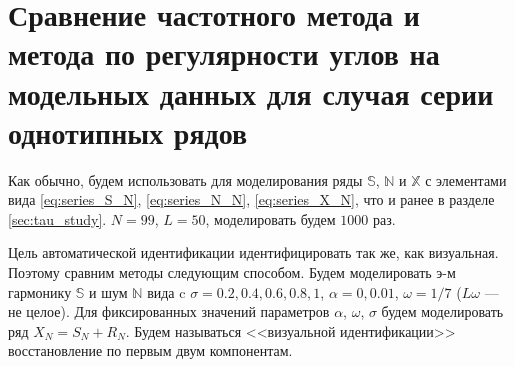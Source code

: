 \documentclass[specialist,
               substylefile = spbu.rtx,
               subf,href,colorlinks=true, 12pt]{disser}
\begin{document}
%
%
%
%

\section{Сравнение частотного метода и метода по регулярности углов на модельных данных для случая серии однотипных рядов}
\label{sec:comp_tau1_pgram_many_same_series}
Как обычно, будем использовать для моделирования ряды $\mathbb{S}$, $\mathbb{N}$ и $\mathbb{X}$ с элементами вида
\eqref{eq:series_S_N}, \eqref{eq:series_N_N}, \eqref{eq:series_X_N}, что и ранее в разделе \ref{sec:tau_study}.
$N = 99$, $L = 50$, моделировать будем $1000$ раз.

Цель автоматической идентификации идентифицировать так же, как визуальная.
Поэтому сравним методы следующим способом.
Будем моделировать э-м гармонику $\mathbb{S}$ и шум $\mathbb{N}$ вида
c $\sigma = 0.2, 0.4, 0.6, 0.8, 1$, $\alpha = 0, 0.01$, $\omega = 1/7$ ($L\omega$ --- не целое).
Для фиксированных значений параметров $\alpha$, $\omega$, $\sigma$ будем моделировать ряд $X_N = S_N + R_N$. Будем называться <<визуальной идентификации>> восстановление по первым двум компонентам.
\end{document}
